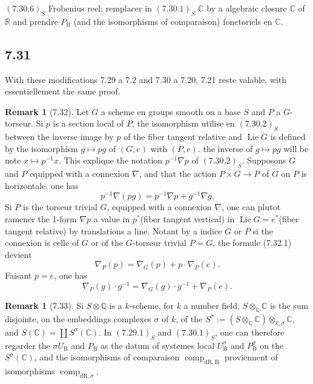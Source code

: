 \documentclass[12pt,a4paper]{article}
\theoremstyle{plain}
\theoremstyle{definition}
\newtheorem{remark}[theorem]{Remark}
\theoremstyle{remark}
\DeclareMathOperator{\Lie}{Lie}
\DeclareMathOperator{\comp}{comp}
\newcommand{\DR}{\mathrm{dR}}
\newcommand{\B}{\mathrm{B}}
\newcommand{\Q}{\mathbb{Q}}
\newcommand{\C}{\mathbb{C}}
\newcommand{\R}{\mathbb{R}}
\begin{document}
$(7.30.6)_S$ Frobenius reel: remplacer in $(7.30.1)_S$ $\C$ by a algebraic closure $\C$ of $\R$ and prendre $P_\B$ (and the isomorphisms of comparaison) fonctoriels en $\C$.

\subsection*{7.31}
With these modifications 7.29 a 7.2 and 7.30 a 7.20, 7.21 reste valable, with essentiellement the same proof.

\begin{remark}[7.32]\label{rem:7.32}
Let $G$ a scheme en groups smooth on a base $S$ and $P$ a $G$-torseur. Si $p$ is a section local of $P$, the isomorphism utilise en $(7.30.2)_S$ between the inverse image by $p$ of the fiber tangent relative and $\Lie G$ is defined by the isomorphism $g \mapsto pg$ of $(G, e)$ with $(P, e)$. the inverse of $g \mapsto pg$ will be note $x \mapsto p^{-1}x$. This explique the notation $p^{-1}\nabla p$ of $(7.30.2)_S$. Supposons $G$ and $P$ equipped with a connexion $\nabla$, and that the action $P \times G \to P$ of $G$ on $P$ is horizontale. one has
\begin{equation*}\tag{7.32.1}
p^{-1}\nabla(p g) = p^{-1}\nabla p + g^{-1}\nabla g.
\end{equation*}
Si $P$ is the torseur trivial $G$, equipped with a connexion $\nabla$, one can plutot ramener the 1-form $\nabla p$ a value in $p^*$(fiber tangent vertical) in $\Lie G = e^*$(fiber tangent relative) by translations a line. Notant by a indice $G$ or $P$ si the connexion is celle of $G$ or of the $G$-torseur trivial $P = G$, the formule (7.32.1) devient
\begin{equation*}\tag{7.32.2}
\nabla_P(p) = \nabla_G(p) + p \cdot \nabla_P(e).
\end{equation*}
Faisant $p = e$, one has
\begin{equation*}\tag{7.32.3}
\nabla_P(g) \cdot g^{-1} = \nabla_G(g) \cdot g^{-1} + \nabla_P(e).
\end{equation*}
\end{remark}

\begin{remark}[7.33]\label{rem:7.33}
Si $S \otimes \Q$ is a $k$-scheme, for $k$ a number field, $S \otimes_\Q \C$ is the sum disjointe, on the embeddings complexes $\sigma$ of $k$, of the $S^\sigma := (S \otimes_\Q \C) \otimes_{k,\sigma} \C$, and $S(\C) = \coprod S^\sigma(\C)$. In $(7.29.1)_S$ and $(7.30.1)_S$, one can therefore regarder the $\sigma U_\B$ and $P_\B$ as the datum of systemes local $U^\sigma_\B$ and $P^\sigma_\B$ on the $S^\sigma(\C)$, and the isomorphisms of comparaison $\comp_{\DR,\B}$ proviennent of isomorphisms $\comp_{\DR,\sigma}$.
\end{remark}
\end{document}
